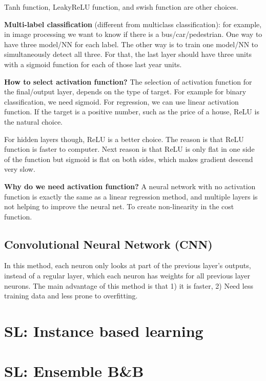 \documentclass[12pt]{report}
\begin{document}
Tanh function, LeakyReLU function, and swish function are other choices.


\textbf{Multi-label classification} (different from multiclass classification): for example, in image processing we want to know if there is a bus/car/pedestrian. One way to have three model/NN for each label. The other way is to train one model/NN to simultaneously detect all three. For that, the last layer should have three units with a sigmoid function for each of those last year units.


\textbf{How to select activation function?}
The selection of activation function for the final/output layer, depends on the type of target. For example for binary classification, we need sigmoid. For regression, we can use linear activation function. If the target is a positive number, such as the price of a house, ReLU is the natural choice.

For hidden layers though, ReLU is a better choice. The reason is that ReLU function is faster to computer. Next reason is that ReLU is only flat in one side of the function but sigmoid is flat on both sides, which makes gradient descend very slow.



\textbf{Why do we need activation function?}
A neural network with no activation function is exactly the same as a linear regression method, and multiple layers is not helping to improve the neural net.  To create non-linearity in the cost function.



\subsection{Convolutional Neural Network (CNN)}
In this method, each neuron only looks at part of the previous layer's outputs, instead of a regular layer, which each neuron has weights for all previous layer neurons. The main advantage of this method is that 1) it is faster, 2) Need less training data and less prone to overfitting.



\section{SL: Instance based learning}
\section{SL: Ensemble B\&B}
\end{document}
